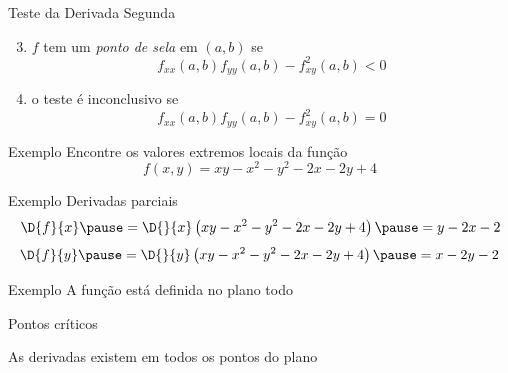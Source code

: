 \begin{frame}{Teste da Derivada Segunda}
\begin{enumerate}[<+->]
  \setcounter{enumi}{2}
  \item $f$ tem um \emph{ponto de sela} em $(a, b)$ se
  \[
    f_{xx}(a, b) f_{yy}(a, b) - f^2_{xy}(a, b) \bm{<} 0
  \]
  \item o teste é inconclusivo se
  \[
    f_{xx}(a, b) f_{yy}(a, b) - f^2_{xy}(a, b) \bm{=} 0
  \]
\end{enumerate}
\end{frame}

\addtocounter{exemplo}{1}
\begin{frame}{Exemplo \theexemplo}
  Encontre os valores extremos locais da função
  \[
    f(x, y) = xy -x^2 - y^2 -2x -2y +4
  \]
\end{frame}

\begin{frame}{Exemplo \theexemplo}
  Derivadas parciais
  \pause
  \vspace{\baselineskip}
  \[
    \D{f}{x}
    \pause
    = \D{}{x}\left(xy -x^2 - y^2 -2x -2y +4\right)
    \pause
    = y -2x -2
  \]
  \pause
  \vspace{\baselineskip}
  \[
    \D{f}{y}
    \pause
    = \D{}{y}\left(xy -x^2 - y^2 -2x -2y +4\right)
    \pause
    = x -2y -2
  \]
\end{frame}

\begin{frame}{Exemplo \theexemplo}
  A função está definida no plano todo

  \pause
  \vspace{\baselineskip}
  Pontos críticos

  \pause
  \vspace{\baselineskip}
  As derivadas existem em todos os pontos do plano
\end{frame}

